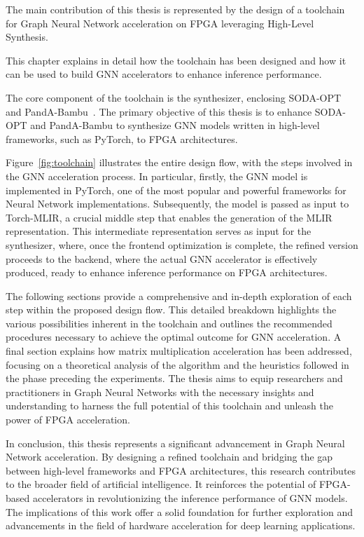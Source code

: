 The main contribution of this thesis is represented by the design of a toolchain for Graph Neural Network acceleration on FPGA leveraging High-Level Synthesis.

This chapter explains in detail how the toolchain has been designed and how it can be used to build GNN accelerators to enhance inference performance.

The core component of the toolchain is the synthesizer, enclosing SODA-OPT~\cite{9786533} and PandA-Bambu~\cite{9586110}.
The primary objective of this thesis is to enhance SODA-OPT and PandA-Bambu to synthesize GNN models written in high-level frameworks, such as PyTorch, to FPGA architectures.

Figure~\ref{fig:toolchain} illustrates the entire design flow, with the steps involved in the GNN acceleration process.
In particular, firstly, the GNN model is implemented in PyTorch, one of the most popular and powerful frameworks for Neural Network implementations.
Subsequently, the model is passed as input to Torch-MLIR, a crucial middle step that enables the generation of the MLIR representation.
This intermediate representation serves as input for the synthesizer, where, once the frontend optimization is complete, the refined version proceeds to the backend, where the actual GNN accelerator is effectively produced, ready to enhance inference performance on FPGA architectures.

The following sections provide a comprehensive and in-depth exploration of each step within the proposed design flow.
This detailed breakdown highlights the various possibilities inherent in the toolchain and outlines the recommended procedures necessary to achieve the optimal outcome for GNN acceleration.
A final section explains how matrix multiplication acceleration has been addressed, focusing on a theoretical analysis of the algorithm and the heuristics followed in the phase preceding the experiments.
The thesis aims to equip researchers and practitioners in Graph Neural Networks with the necessary insights and understanding to harness the full potential of this toolchain and unleash the power of FPGA acceleration.

In conclusion, this thesis represents a significant advancement in Graph Neural Network acceleration.
By designing a refined toolchain and bridging the gap between high-level frameworks and FPGA architectures, this research contributes to the broader field of artificial intelligence.
It reinforces the potential of FPGA-based accelerators in revolutionizing the inference performance of GNN models.
The implications of this work offer a solid foundation for further exploration and advancements in the field of hardware acceleration for deep learning applications.

